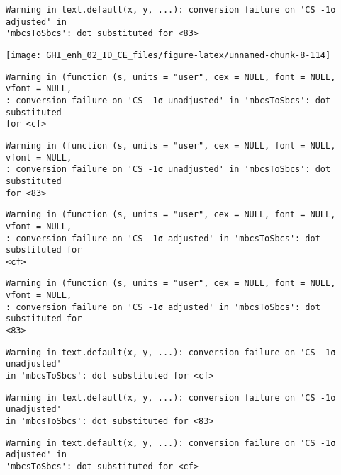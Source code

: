 \documentclass[
  10pt,
  a4paper,oneside]{article}
\begin{document}
\begin{verbatim}
Warning in text.default(x, y, ...): conversion failure on 'CS -1σ adjusted' in
'mbcsToSbcs': dot substituted for <83>
\end{verbatim}

\begin{center}\texttt{[image: GHI\_enh\_02\_ID\_CE\_files/figure-latex/unnamed-chunk-8-114]} \end{center}

\begin{verbatim}
Warning in (function (s, units = "user", cex = NULL, font = NULL, vfont = NULL,
: conversion failure on 'CS -1σ unadjusted' in 'mbcsToSbcs': dot substituted
for <cf>
\end{verbatim}

\begin{verbatim}
Warning in (function (s, units = "user", cex = NULL, font = NULL, vfont = NULL,
: conversion failure on 'CS -1σ unadjusted' in 'mbcsToSbcs': dot substituted
for <83>
\end{verbatim}

\begin{verbatim}
Warning in (function (s, units = "user", cex = NULL, font = NULL, vfont = NULL,
: conversion failure on 'CS -1σ adjusted' in 'mbcsToSbcs': dot substituted for
<cf>
\end{verbatim}

\begin{verbatim}
Warning in (function (s, units = "user", cex = NULL, font = NULL, vfont = NULL,
: conversion failure on 'CS -1σ adjusted' in 'mbcsToSbcs': dot substituted for
<83>
\end{verbatim}

\begin{verbatim}
Warning in text.default(x, y, ...): conversion failure on 'CS -1σ unadjusted'
in 'mbcsToSbcs': dot substituted for <cf>
\end{verbatim}

\begin{verbatim}
Warning in text.default(x, y, ...): conversion failure on 'CS -1σ unadjusted'
in 'mbcsToSbcs': dot substituted for <83>
\end{verbatim}

\begin{verbatim}
Warning in text.default(x, y, ...): conversion failure on 'CS -1σ adjusted' in
'mbcsToSbcs': dot substituted for <cf>
\end{verbatim}
\end{document}
